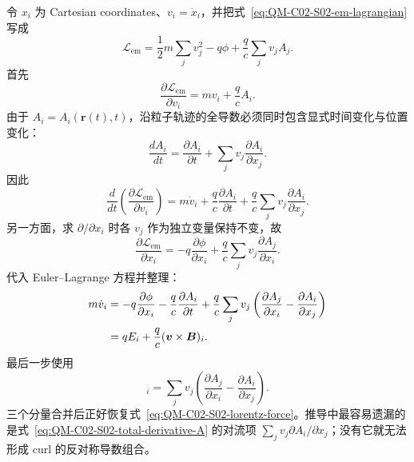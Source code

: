 
令 $x_i$ 为 Cartesian coordinates、$v_i=\dot x_i$，并把式~\eqref{eq:QM-C02-S02-em-lagrangian} 写成
\[
  \mathcal L_{\mathrm{em}}
  =\frac12m\sum_jv_j^2-q\phi
  +\frac qc\sum_jv_jA_j.
\]
首先
\begin{equation}
  \frac{\partial\mathcal L_{\mathrm{em}}}{\partial v_i}
  =mv_i+\frac qcA_i.
  \label{eq:QM-C02-S02-dl-dv}
\end{equation}
由于 $A_i=A_i(\bm r(t),t)$，沿粒子轨迹的全导数必须同时包含显式时间变化与位置变化：
\begin{equation}
  \frac{dA_i}{dt}
  =\frac{\partial A_i}{\partial t}
  +\sum_jv_j\frac{\partial A_i}{\partial x_j}.
  \label{eq:QM-C02-S02-total-derivative-A}
\end{equation}
因此
\begin{equation}
  \frac{d}{dt}
  \left(\frac{\partial\mathcal L_{\mathrm{em}}}{\partial v_i}\right)
  =m\dot v_i+\frac qc\frac{\partial A_i}{\partial t}
  +\frac qc\sum_jv_j\frac{\partial A_i}{\partial x_j}.
  \label{eq:QM-C02-S02-dt-dl-dv}
\end{equation}
另一方面，求 $\partial/\partial x_i$ 时各 $v_j$ 作为独立变量保持不变，故
\begin{equation}
  \frac{\partial\mathcal L_{\mathrm{em}}}{\partial x_i}
  =-q\frac{\partial\phi}{\partial x_i}
  +\frac qc\sum_jv_j\frac{\partial A_j}{\partial x_i}.
  \label{eq:QM-C02-S02-dl-dx}
\end{equation}
代入 Euler--Lagrange 方程并整理：
\begin{align}
  m\dot v_i
  &=-q\frac{\partial\phi}{\partial x_i}
    -\frac qc\frac{\partial A_i}{\partial t}
    +\frac qc\sum_jv_j
      \left(
        \frac{\partial A_j}{\partial x_i}
        -\frac{\partial A_i}{\partial x_j}
      \right)\notag\\
  &=qE_i+\frac qc(\bm v\times\bm B)_i.
  \label{eq:QM-C02-S02-lorentz-components}
\end{align}
最后一步使用
\begin{equation}
  [\bm v\times(\nabla\times\bm A)]_i
  =\sum_jv_j
  \left(
    \frac{\partial A_j}{\partial x_i}
    -\frac{\partial A_i}{\partial x_j}
  \right).
  \label{eq:QM-C02-S02-curl-identity}
\end{equation}
三个分量合并后正好恢复式~\eqref{eq:QM-C02-S02-lorentz-force}。推导中最容易遗漏的是式~\eqref{eq:QM-C02-S02-total-derivative-A} 的对流项 $\sum_jv_j\partial A_i/\partial x_j$；没有它就无法形成 curl 的反对称导数组合。

